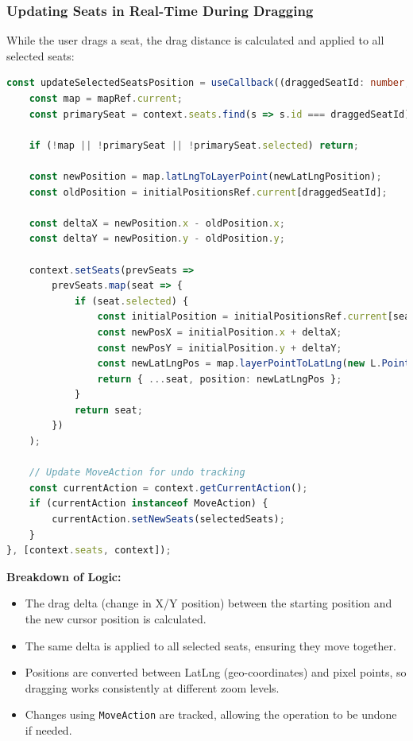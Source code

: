 \subsubsection{Updating Seats in Real-Time During Dragging}
While the user drags a seat, the drag distance is calculated and applied to all selected seats:

\begin{lstlisting}[language=TypeScript, caption=Updating Seat Positions During Dragging, label=lst:seat-live-dragging]
const updateSelectedSeatsPosition = useCallback((draggedSeatId: number, newLatLngPosition: { lat: number; lng: number }) => {
    const map = mapRef.current;
    const primarySeat = context.seats.find(s => s.id === draggedSeatId);

    if (!map || !primarySeat || !primarySeat.selected) return;

    const newPosition = map.latLngToLayerPoint(newLatLngPosition);
    const oldPosition = initialPositionsRef.current[draggedSeatId];

    const deltaX = newPosition.x - oldPosition.x;
    const deltaY = newPosition.y - oldPosition.y;

    context.setSeats(prevSeats =>
        prevSeats.map(seat => {
            if (seat.selected) {
                const initialPosition = initialPositionsRef.current[seat.id];
                const newPosX = initialPosition.x + deltaX;
                const newPosY = initialPosition.y + deltaY;
                const newLatLngPos = map.layerPointToLatLng(new L.Point(newPosX, newPosY));
                return { ...seat, position: newLatLngPos };
            }
            return seat;
        })
    );

    // Update MoveAction for undo tracking
    const currentAction = context.getCurrentAction();
    if (currentAction instanceof MoveAction) {
        currentAction.setNewSeats(selectedSeats);
    }
}, [context.seats, context]);
\end{lstlisting}

\textbf{Breakdown of Logic:}
\begin{itemize}
    \item The drag delta (change in X/Y position) between the starting position and the new cursor position is calculated.
    \item The same delta is applied to all selected seats, ensuring they move together.
    \item Positions are converted between LatLng (geo-coordinates) and pixel points, so dragging works consistently at different zoom levels.
    \item Changes using \texttt{MoveAction} are tracked, allowing the operation to be undone if needed.
\end{itemize}

